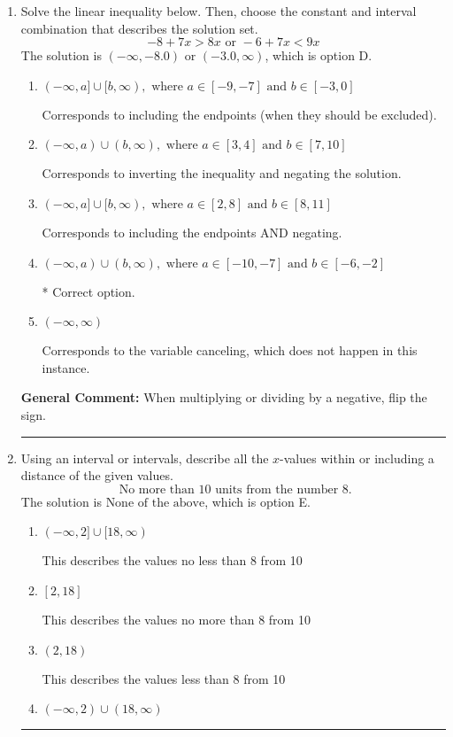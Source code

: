 \documentclass{extbook}[14pt]
\newcommand{\litem}[1]{\item #1

\rule{\textwidth}{0.4pt}}
\begin{document}
\begin{enumerate}\litem{
Solve the linear inequality below. Then, choose the constant and interval combination that describes the solution set.
\[ -8 + 7 x > 8 x \text{ or } -6 + 7 x < 9 x \]
The solution is \( (-\infty, -8.0) \text{ or } (-3.0, \infty) \), which is option D.\begin{enumerate}[label=\Alph*.]
\item \( (-\infty, a] \cup [b, \infty), \text{ where } a \in [-9, -7] \text{ and } b \in [-3, 0] \)

Corresponds to including the endpoints (when they should be excluded).
\item \( (-\infty, a) \cup (b, \infty), \text{ where } a \in [3, 4] \text{ and } b \in [7, 10] \)

Corresponds to inverting the inequality and negating the solution.
\item \( (-\infty, a] \cup [b, \infty), \text{ where } a \in [2, 8] \text{ and } b \in [8, 11] \)

Corresponds to including the endpoints AND negating.
\item \( (-\infty, a) \cup (b, \infty), \text{ where } a \in [-10, -7] \text{ and } b \in [-6, -2] \)

 * Correct option.
\item \( (-\infty, \infty) \)

Corresponds to the variable canceling, which does not happen in this instance.
\end{enumerate}

\textbf{General Comment:} When multiplying or dividing by a negative, flip the sign.
}
\litem{
Using an interval or intervals, describe all the $x$-values within or including a distance of the given values.
\[ \text{ No more than } 10 \text{ units from the number } 8. \]
The solution is \( \text{None of the above} \), which is option E.\begin{enumerate}[label=\Alph*.]
\item \( (-\infty, 2] \cup [18, \infty) \)

This describes the values no less than 8 from 10
\item \( [2, 18] \)

This describes the values no more than 8 from 10
\item \( (2, 18) \)

This describes the values less than 8 from 10
\item \( (-\infty, 2) \cup (18, \infty) \)


\end{enumerate}}
\end{enumerate}
\end{document}
